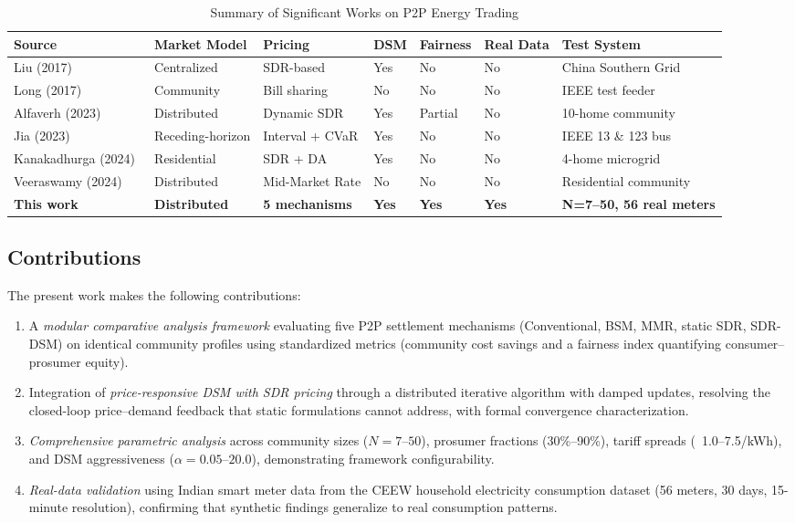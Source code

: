\documentclass[pdflatex,sn-mathphys-num]{sn-jnl}
\newcommand{\rupee}{\text{Rs.}}
\theoremstyle{thmstyleone}
\theoremstyle{thmstyletwo}
\begin{document}
\begin{table}[t]
\caption{Summary of Significant Works on P2P Energy Trading}
\label{tab:literature}
\centering
\footnotesize
\begin{tabular}{p{2.5cm}p{2.2cm}p{2.5cm}p{1.2cm}p{1.8cm}p{1.5cm}p{2.5cm}}
\toprule
\textbf{Source} & \textbf{Market Model} & \textbf{Pricing} & \textbf{DSM} & \textbf{Fairness} & \textbf{Real Data} & \textbf{Test System} \\
\midrule
Liu (2017)~\cite{liu2017} & Centralized & SDR-based & Yes & No & No & China Southern Grid \\
Long (2017)~\cite{long2017} & Community & Bill sharing & No & No & No & IEEE test feeder \\
Alfaverh (2023)~\cite{alfaverh2023} & Distributed & Dynamic SDR & Yes & Partial & No & 10-home community \\
Jia (2023)~\cite{jia2023} & Receding-horizon & Interval + CVaR & Yes & No & No & IEEE 13 \& 123 bus \\
Kanakadhurga (2024)~\cite{kanakadhurga2024} & Residential & SDR + DA & Yes & No & No & 4-home microgrid \\
Veeraswamy (2024)~\cite{veeraswamy2024} & Distributed & Mid-Market Rate & No & No & No & Residential community \\
\textbf{This work} & \textbf{Distributed} & \textbf{5 mechanisms} & \textbf{Yes} & \textbf{Yes} & \textbf{Yes} & \textbf{N=7--50, 56 real meters} \\
\bottomrule
\end{tabular}
\end{table}

\subsection{Contributions}

The present work makes the following contributions:
\begin{enumerate}
    \item A \textit{modular comparative analysis framework} evaluating five P2P settlement mechanisms (Conventional, BSM, MMR, static SDR, SDR-DSM) on identical community profiles using standardized metrics (community cost savings and a fairness index quantifying consumer--prosumer equity).
    \item Integration of \textit{price-responsive DSM with SDR pricing} through a distributed iterative algorithm with damped updates, resolving the closed-loop price--demand feedback that static formulations cannot address, with formal convergence characterization.
    \item \textit{Comprehensive parametric analysis} across community sizes ($N=7$--$50$), prosumer fractions (30\%--90\%), tariff spreads (\rupee~1.0--7.5/kWh), and DSM aggressiveness ($\alpha = 0.05$--$20.0$), demonstrating framework configurability.
    \item \textit{Real-data validation} using Indian smart meter data from the CEEW household electricity consumption dataset (56 meters, 30 days, 15-minute resolution), confirming that synthetic findings generalize to real consumption patterns.
\end{enumerate}
\end{document}
